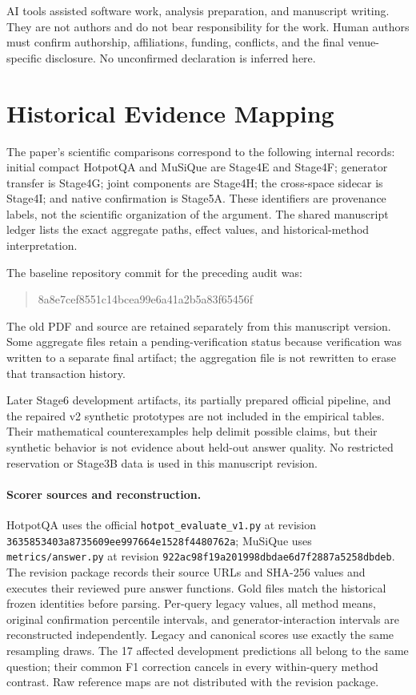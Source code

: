 \documentclass[11pt,a4paper]{article}
\begin{document}
AI tools assisted software work, analysis preparation, and manuscript
writing. They are not authors and do not bear responsibility for the work.
Human authors must confirm authorship, affiliations, funding, conflicts,
and the final venue-specific disclosure. No unconfirmed declaration is
inferred here.



\appendix
\section{Historical Evidence Mapping}
\label{app:scoring}
The paper's scientific comparisons correspond to the following internal
records: initial compact HotpotQA and MuSiQue are Stage4E and Stage4F;
generator transfer is Stage4G; joint components are Stage4H; the cross-space
sidecar is Stage4I; and native confirmation is Stage5A. These identifiers
are provenance labels, not the scientific organization of the argument.
The shared manuscript ledger lists the exact aggregate paths, effect
values, and historical-method interpretation.

\begin{samepage}
The baseline repository commit for the preceding audit was:
\begin{quote}\small\ttfamily
8a8e7cef8551c14bcea99e6a41a2b5a83f65456f
\end{quote}
\end{samepage}
The old PDF and source are retained separately from this manuscript version.
Some aggregate files retain a pending-verification status because verification
was written to a separate final artifact; the aggregation file is not
rewritten to erase that transaction history.

Later Stage6 development artifacts, its partially prepared official pipeline,
and the repaired v2 synthetic prototypes are not included in the empirical
tables. Their mathematical counterexamples help delimit possible claims,
but their synthetic behavior is not evidence about held-out answer quality.
No restricted reservation or Stage3B data is used in this manuscript revision.

\paragraph{Scorer sources and reconstruction.}
HotpotQA uses the official \texttt{hotpot\_evaluate\_v1.py} at revision
\texttt{3635853403a8735609ee997664e1528f4480762a}; MuSiQue uses
\texttt{metrics/answer.py} at revision
\texttt{922ac98f19a201998dbdae6d7f2887a5258dbdeb}. The revision package records
their source URLs and SHA-256 values and executes their reviewed pure answer
functions. Gold files match the historical frozen identities before parsing.
Per-query legacy values, all method means, original confirmation percentile
intervals, and generator-interaction intervals are reconstructed independently.
Legacy and canonical scores use exactly the same resampling draws. The
17 affected development predictions all belong to the same question; their
common F1 correction cancels in every within-query method contrast. Raw
reference maps are not distributed with the revision package.
\end{document}
